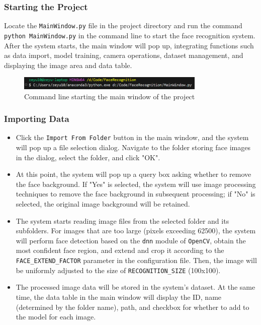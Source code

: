 \documentclass{article}
\begin{document}
\subsubsection{Starting the Project}
Locate the \texttt{MainWindow.py} file in the project directory and run the command \texttt{python MainWindow.py} in the command line to start the face recognition system. After the system starts, the main window will pop up, integrating functions such as data import, model training, camera operations, dataset management, and displaying the image area and data table.

\begin{figure}[H]
    \centering
    \includegraphics[width=0.8\textwidth]{Img/PixPin_2025-03-09_00-37-52.png}
    \caption{Command line starting the main window of the project}
\end{figure}

\subsubsection{Importing Data}
\begin{itemize}
    \item Click the \texttt{Import From Folder} button in the main window, and the system will pop up a file selection dialog. Navigate to the folder storing face images in the dialog, select the folder, and click "OK".
    \item At this point, the system will pop up a query box asking whether to remove the face background. If "Yes" is selected, the system will use image processing techniques to remove the face background in subsequent processing; if "No" is selected, the original image background will be retained.
    \item The system starts reading image files from the selected folder and its subfolders. For images that are too large (pixels exceeding 62500), the system will perform face detection based on the \texttt{dnn} module of \texttt{OpenCV}, obtain the most confident face region, and extend and crop it according to the \texttt{FACE\_EXTEND\_FACTOR} parameter in the configuration file. Then, the image will be uniformly adjusted to the size of \texttt{RECOGNITION\_SIZE} (100x100).
    \item The processed image data will be stored in the system's dataset. At the same time, the data table in the main window will display the ID, name (determined by the folder name), path, and checkbox for whether to add to the model for each image.
\end{itemize}
\end{document}
